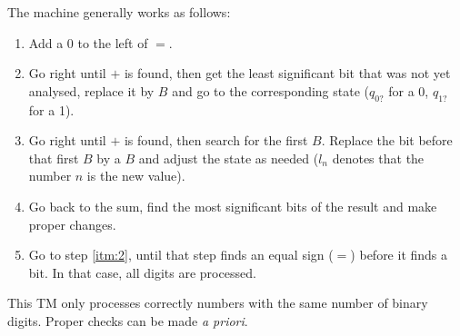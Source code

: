 \documentclass[docid=TP11]{tcom_TP}
\begin{document}
{\begin{center}
\end{center}
The machine generally works as follows:
\begin{enumerate}
	\item Add a $0$ to the left of $=$.
	\item \label{itm:2} Go right until $+$ is found, then get the least significant bit that was not yet analysed, replace it by $B$ and go to the corresponding state ($q_{0?}$ for a 0, $q_{1?}$ for a 1).
	\item Go right until $+$ is found, then search for the first $B$. Replace the bit before that first $B$ by a $B$ and adjust the state as needed ($l_n$ denotes that the number $n$ is the new value).
	\item Go back to the sum, find the most significant bits of the result and make proper changes.
	\item Go to step \ref{itm:2}, until that step finds an equal sign ($=$) before it finds a bit. In that case, all digits are processed.
\end{enumerate}
This TM only processes correctly numbers with the same number of binary digits. Proper checks can be made \textit{a priori}.
}
\end{document}
